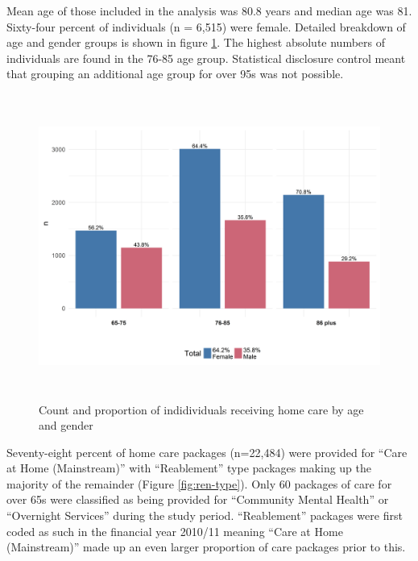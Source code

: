 \documentclass[]{article}
\begin{document}
Mean age of those included in the analysis was 80.8 years and median age
was 81. Sixty-four percent of individuals (n = 6,515) were female.
Detailed breakdown of age and gender groups is shown in figure
\ref{fig:ren-age-gen}. The highest absolute numbers of individuals are
found in the 76-85 age group. Statistical disclosure control meant that
grouping an additional age group for over 95s was not possible.

\begin{figure}[]
  \centering
    \includegraphics[height = 10cm]{figures/chapter-renf/01-age-gender-ts-subset.png}
    \caption{Count and proportion of indidividuals receiving home care by age and gender}
    \label{fig:ren-age-gen}
\end{figure}

Seventy-eight percent of home care packages (n=22,484) were provided for
``Care at Home (Mainstream)'' with ``Reablement'' type packages making
up the majority of the remainder (Figure \ref{fig:ren-type}). Only 60
packages of care for over 65s were classified as being provided for
``Community Mental Health'' or ``Overnight Services'' during the study
period. ``Reablement'' packages were first coded as such in the
financial year 2010/11 meaning ``Care at Home (Mainstream)'' made up an
even larger proportion of care packages prior to this.
\end{document}
